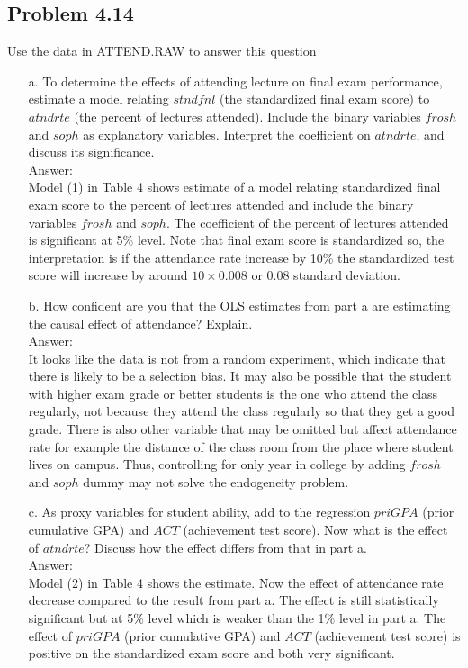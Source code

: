 \documentclass[10pt]{article}
\begin{document}
\subsection*{Problem 4.14}
Use the data in ATTEND.RAW to answer this question
\begin{enumerate}
\item[a.] To determine the effects of attending lecture on final exam performance, estimate a model relating $stndfnl$ (the standardized final exam score) to $atndrte$ (the percent of lectures attended). Include the binary variables $frosh$ and $soph$ as explanatory variables. Interpret the coefficient on $atndrte$, and discuss its significance.
\\ Answer:\\
Model (1) in Table 4 shows estimate of a model relating standardized final exam score to the percent of lectures attended and include the binary variables $frosh$ and $soph$. The coefficient of the percent of lectures attended is significant at 5\% level. Note that final exam score is standardized so, the interpretation is if the attendance rate increase by 10\% the standardized test score will increase by around $10\times0.008$ or 0.08 standard deviation.
\item[b.] How confident are you that the OLS estimates from part a are estimating the causal effect of attendance? Explain.
\\ Answer:\\
It looks like the data is not from a random experiment, which indicate that there is likely to be a selection bias. It may also be possible that the student with higher exam grade or better students is the one who attend the class regularly, not because they attend the class regularly so that they get a good grade. There is also other variable that may be omitted but affect attendance rate for example the distance of the class room from the place where student lives on campus. Thus, controlling for only year in college by adding $frosh$ and $soph$ dummy may not solve the endogeneity problem. 

\item[c.] As proxy variables for student ability, add to the regression $priGPA$ (prior cumulative GPA) and $ACT$ (achievement test score). Now what is the effect of $atndrte$? Discuss how the effect differs from that in part a.
\\ Answer:\\
Model (2) in Table 4 shows the estimate. Now the effect of attendance rate decrease compared to the result from part a. The effect is still statistically significant but at 5\% level which is weaker than the 1\% level in part a. The effect of $priGPA$ (prior cumulative GPA) and $ACT$ (achievement test score) is positive on the standardized exam score and both very significant.



\end{enumerate}
\end{document}
